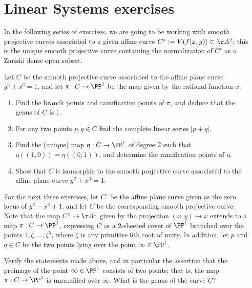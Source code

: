 

\chapter{Linear Systems exercises}\label{linear systems exercises}

In the following series of exercises, we are going to be working with smooth projective curves associated to a given affine curve $C^\circ := V(f(x,y)) \subset \AA^2$; this is the unique smooth projective curve containing the normalization of $C^\circ$ as a Zariski dense open subset.

\begin{exercise}
Let $C$ be the smooth projective curve associated to the affine plane curve $y^3 +x^3 = 1$, and let $\pi : C \to \PP^1$ be the map given by the rational function $x$.
\begin{enumerate}
\item Find the branch points and ramification points of $\pi$, and deduce that the genus of $C$ is 1.
\item For any two points $p, q \in C$ find the complete linear series $|p+q|$.
\item Find the (unique) map $\eta : C \to \PP^1$ of degree 2 such that $\eta((1,0)) = \eta((0,1))$, and determine the ramification points of $\eta$.
\item Show that $C$ is isomorphic to the smooth projective curve associated to the affine plane curve $y^2 +x^3 = 1$.
\end{enumerate}
\end{exercise}

For the next three exercises, let $C^\circ$ be the affine plane curve given as the zero locus of $y^2 - x^6 +1$, and let $C$ be the corresponding smooth projective curve. Note that the map $C^\circ \to \AA^1$ given by the projection $(x,y) \mapsto x$ extends to a map $\pi : C \to \PP^1$, expressing $C$ as a 2-sheeted cover of $\PP^1$ branched over the points $1, \zeta, \dots, \zeta^5$, where $\zeta$ is any primitive 6th root of unity. In addition, let $p$ and $q \in C$ be the two points lying over the point $\infty \in \PP^1$.

\begin{exercise}
Verify the statements made above, and in particular the assertion that the preimage of the point $\infty \in \PP^1$ consists of two points; that is, the map $\pi : C \to \PP^1$ is unramified over $\infty$. What is the genus of the curve $C$?
\end{exercise}

